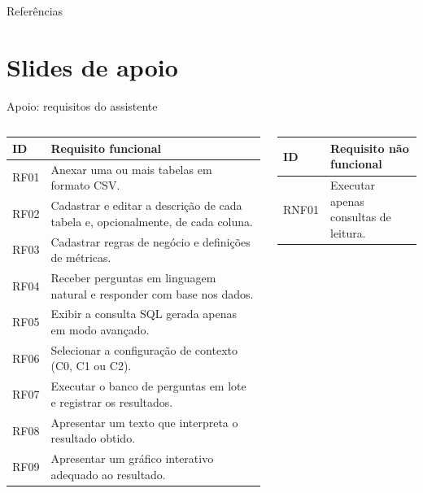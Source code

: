 \documentclass[aspectratio=169,10pt]{beamer}
\newcommand{\cab}[1]{\textcolor{UnBAzul}{\textbf{#1}}}
\begin{document}
\begin{frame}[allowframebreaks]{Referências}
  \scriptsize
  \setlength{\emergencystretch}{2em}
  
  
\end{frame}

\appendix
\section{Slides de apoio}

\begin{frame}{Apoio: requisitos do assistente}
  \scriptsize
  \begin{columns}[T,onlytextwidth]
    \begin{column}{0.54\textwidth}
      \begin{tabular}{@{}lL{64mm}@{}}
        \toprule
        \cab{ID} & \cab{Requisito funcional}\\
        \midrule
        RF01 & Anexar uma ou mais tabelas em formato CSV.\\
        RF02 & Cadastrar e editar a descrição de cada tabela e, opcionalmente, de cada coluna.\\
        RF03 & Cadastrar regras de negócio e definições de métricas.\\
        RF04 & Receber perguntas em linguagem natural e responder com base nos dados.\\
        RF05 & Exibir a consulta SQL gerada apenas em modo avançado.\\
        RF06 & Selecionar a configuração de contexto (C0, C1 ou C2).\\
        RF07 & Executar o banco de perguntas em lote e registrar os resultados.\\
        RF08 & Apresentar um texto que interpreta o resultado obtido.\\
        RF09 & Apresentar um gráfico interativo adequado ao resultado.\\
        \bottomrule
      \end{tabular}
    \end{column}
    \begin{column}{0.44\textwidth}
      \begin{tabular}{@{}lL{50mm}@{}}
        \toprule
        \cab{ID} & \cab{Requisito não funcional}\\
        \midrule
        RNF01 & Executar apenas consultas de leitura.\\

\end{tabular}
\end{column}
\end{columns}
\end{frame}
\end{document}
